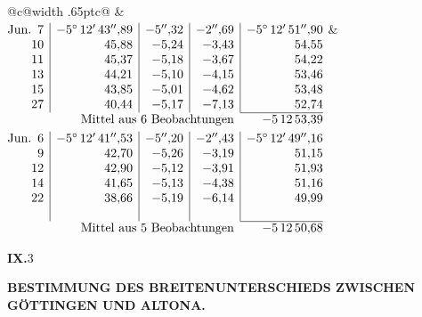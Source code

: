 \noindent\begin{tabular}{@{}c@{\hspace{.4em}\vrule width .65pt\hspace{.4em}}c@{}}
 &
 \\[.18ex]
\(\begin{array}[t]{@{}r|r|r|r|r@{}}
\text{Jun.}\enspace 7 & -5^\circ\,12'\,43''{,}89 & -5''{,}32 & -2''{,}69 & -5^\circ\,12'\,51''{,}90\\
10 & 45{,}88 & -5{,}24 & -3{,}43 & 54{,}55\\
11 & 45{,}37 & -5{,}18 & -3{,}67 & 54{,}22\\
13 & 44{,}21 & -5{,}10 & -4{,}15 & 53{,}46\\
15 & 43{,}85 & -5{,}01 & -4{,}62 & 53{,}48\\
27 & 40{,}44 & -5{,}17 & -7{,}13 & 52{,}74\\
\cline{5-5}
\multicolumn{4}{r}{\text{Mittel aus 6 Beobachtungen}} & -5\,12\,53{,}39
\end{array}\)
&
\(\begin{array}[t]{@{}r|r|r|r|r@{}}
\text{Jun.}\enspace 6 & -5^\circ\,12'\,41''{,}53 & -5''{,}20 & -2''{,}43 & -5^\circ\,12'\,49''{,}16\\
9 & 42{,}70 & -5{,}26 & -3{,}19 & 51{,}15\\
12 & 42{,}90 & -5{,}12 & -3{,}91 & 51{,}93\\
14 & 41{,}65 & -5{,}13 & -4{,}38 & 51{,}16\\
22 & 38{,}66 & -5{,}19 & -6{,}14 & 49{,}99\\
 & & & & \\
\cline{5-5}
\multicolumn{4}{r}{\text{Mittel aus 5 Beobachtungen}} & -5\,12\,50{,}68
\end{array}\)
\end{tabular}\par\medskip
\noindent\textbf{IX.}\hfill 3\hspace{.12\textwidth}\par

\par\clearpage
\noindent{}\parbox[t]{\dimexpr\linewidth-24mm\relax}{\centering\scriptsize\bfseries BESTIMMUNG DES BREITENUNTERSCHIEDS ZWISCHEN GÖTTINGEN UND ALTONA.}\makebox[12mm][r]{}\par\medskip

